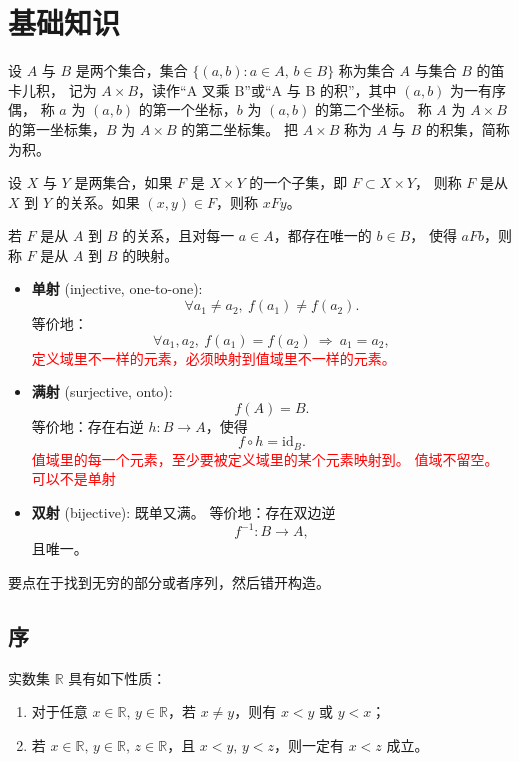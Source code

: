 \chapter{基础知识}
\begin{definition}[笛卡尔积]
设 $A$ 与 $B$ 是两个集合，集合 $\{(a,b): a\in A,\, b\in B\}$ 称为集合 $A$ 与集合 $B$ 的笛卡儿积，
记为 $A\times B$，读作“A 叉乘 B”或“A 与 B 的积”，其中 $(a,b)$ 为一有序偶，
称 $a$ 为 $(a,b)$ 的第一个坐标，$b$ 为 $(a,b)$ 的第二个坐标。
称 $A$ 为 $A\times B$ 的第一坐标集，$B$ 为 $A\times B$ 的第二坐标集。
把 $A\times B$ 称为 $A$ 与 $B$ 的积集，简称为积。
\end{definition}

\begin{definition}[1.2]
设 $X$ 与 $Y$ 是两集合，如果 $F$ 是 $X\times Y$ 的一个子集，即 $F\subset X\times Y$，
则称 $F$ 是从 $X$ 到 $Y$ 的关系。如果 $(x,y)\in F$，则称 $xFy$。
\end{definition}

\begin{definition}[1.3]
若 $F$ 是从 $A$ 到 $B$ 的关系，且对每一 $a\in A$，都存在唯一的 $b\in B$，
使得 $aFb$，则称 $F$ 是从 $A$ 到 $B$ 的映射。
\end{definition}
\begin{itemize}
  \item \textbf{单射} (injective, one-to-one): 
  \[
    \forall a_1 \neq a_2, \ f(a_1) \neq f(a_2).
  \]
  等价地：
  \[
    \forall a_1, a_2, \ f(a_1) = f(a_2) \ \Rightarrow \ a_1 = a_2,
  \]
\textcolor{red}{定义域里不一样的元素，必须映射到值域里不一样的元素。}
  \item \textbf{满射} (surjective, onto):
  \[
    f(A) = B.
  \]
  等价地：存在右逆 \( h:B\to A \)，使得
  \[
    f \circ h = \mathrm{id}_B.
  \]
\textcolor{red}{值域里的每一个元素，至少要被定义域里的某个元素映射到。 值域不留空。可以不是单射}
  \item \textbf{双射} (bijective): 既单又满。  
  等价地：存在双边逆
  \[
    f^{-1}:B \to A,
  \]
  且唯一。
\end{itemize}
\begin{dxtips}[构造无穷对无穷的满射]要点在于找到无穷的部分或者序列，然后错开构造。
    
\end{dxtips}
\section{序}
实数集 $\mathbb{R}$ 具有如下性质：
\begin{enumerate}
  \item 对于任意 $x \in \mathbb{R},\, y \in \mathbb{R}$，若 $x \ne y$，则有 $x<y$ 或 $y<x$；
  \item 若 $x \in \mathbb{R},\, y \in \mathbb{R},\, z \in \mathbb{R}$，且 $x<y,\, y<z$，则一定有 $x<z$ 成立。
\end{enumerate}

